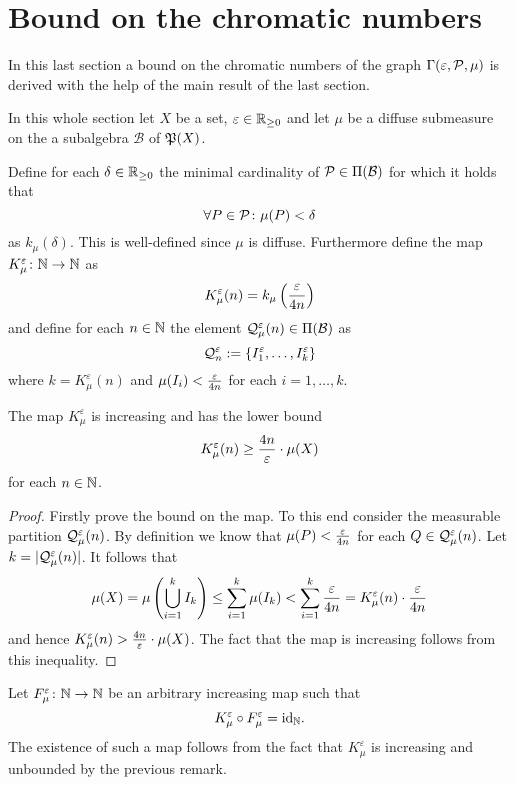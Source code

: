 \section{Bound on the chromatic numbers}\label{sec:bounds}

In this last section a bound on the chromatic numbers of the graph $\Gamma(\varepsilon, \P, \mu)$ is derived with the help of the main result of the last section.

In this whole section let $X$ be a set, $\varepsilon \in \R_{\geq 0}$ and let $\mu$ be a diffuse submeasure on the a subalgebra $\mathcal{B}$ of $\PowS(X)$.

\begin{defin}
  Define for each $\delta \in \R_{\geq 0}$ the minimal cardinality of $\P \in \Pi(\mathcal{B})$ for which it holds that \[\forall P \in \P\colon \mu(P) < \delta\] as $k_\mu(\delta)$. This is well-defined since $\mu$ is diffuse.
  Furthermore define the map $K_\mu^\varepsilon\colon \N \to \N$ as \[K_\mu^\varepsilon(n) = k_\mu\left({\varepsilon \over {4n}}\right)\] and define for each $n \in \N$ the element $\Q_\mu^\varepsilon(n) \in \Pi(\mathcal{B})$ as \[\Q_n^\varepsilon := \{I_1^\varepsilon,\ldots, I^\varepsilon_k\}\] where $k = {K_\mu^\varepsilon(n)}$ and $\mu(I_i) < {\varepsilon \over 4n}$ for each $i=1, \ldots, k$.
\end{defin}

\begin{rem}\label{rem:appr}
  The map $K_\mu^\varepsilon$ is increasing and has the lower bound \[K^\varepsilon_\mu(n) \geq {4n \over \varepsilon} \cdot \mu(X)\] for each $n\in \N$.
\end{rem}


\begin{proof}
  Firstly prove the bound on the map. To this end consider the measurable partition $\Q_\mu^\varepsilon(n)$. By definition we know that $\mu(P) <  {\varepsilon \over 4n}$ for each $Q \in \Q_\mu^\varepsilon(n)$. Let $k = |\Q_\mu^\varepsilon(n)|$.
  It follows that
  \begin{equation*}
    \mu(X) = \mu\left(\bigcup_{i=1}^k I_k\right) \leq \sum\limits_{i=1}^k \mu(I_k) < \sum\limits_{i=1}^k{\varepsilon \over 4n} = K_\mu^\varepsilon(n) \cdot {\varepsilon \over 4n}
  \end{equation*}
  and hence $K_\mu^\varepsilon(n) > {4n \over \varepsilon} \cdot \mu(X)$. The fact that the map is increasing follows from this inequality.
\end{proof}

\begin{defin}
  Let $F_\mu^\varepsilon\colon \N \to \N$ be an arbitrary increasing map such that \[K_\mu^\varepsilon \circ F_\mu^\varepsilon = \id_\N.\] The existence of such a map follows from the fact that $K_\mu^\varepsilon$ is increasing and unbounded by the previous remark.
\end{defin}

